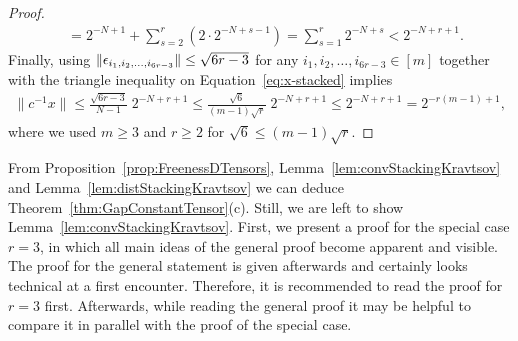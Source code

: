 \begin{proof}
\begin{align*}
		&= 2^{-N+1} + \sum_{s=2}^r \left( 2 \cdot 2^{-N+s-1} \right)
		= \sum_{s=1}^r 2^{-N+s} < 2^{-N + r + 1}.
	\end{align*}
	Finally, using $\| \epsilon_{i_1, i_2, \ldots, i_{6 r - 3}} \| \leq \sqrt{6 r - 3}$ for any $i_1, i_2, \ldots,i_{6r - 3} \in [m]$ together with the triangle inequality on Equation~\eqref{eq:x-stacked} implies
	\begin{align*}
		\| c^{-1} x\| \leq \frac{\sqrt{6 r - 3}}{N - 1} \; 2^{-N + r + 1}
		\leq \frac{\sqrt{6}}{(m-1)\sqrt{r}} \; 2^{-N + r + 1} \leq 2^{-N + r + 1} = 2^{- r (m-1) + 1},
	\end{align*}
	where we used $m \geq 3$ and $r \geq 2$ for $\sqrt{6} \leq (m-1) \sqrt{r}$.
\end{proof}

From Proposition~\ref{prop:FreenessDTensors}, Lemma~\ref{lem:convStackingKravtsov} and Lemma~\ref{lem:distStackingKravtsov} we
can deduce Theorem~\ref{thm:GapConstantTensor}(c). Still, we are left to show Lemma~\ref{lem:convStackingKravtsov}. First, we present a proof for the special case $r=3$, in which all main ideas of the general proof become apparent and visible. The proof for the general statement is given afterwards and certainly looks technical at a first encounter. Therefore, it is recommended to read the proof for $r=3$ first. Afterwards, while reading the general proof it may be helpful to compare it in parallel with the proof of the special case.

